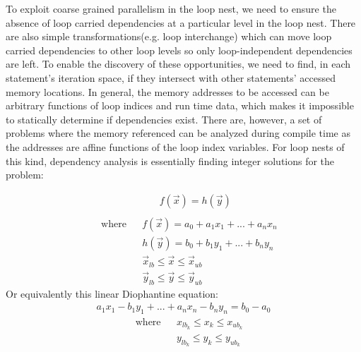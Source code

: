 To exploit coarse grained parallelism in the loop nest, we need to ensure the
absence of loop carried dependencies at a particular level in the loop nest. There are also simple transformations(e.g. loop interchange) which can move loop carried
dependencies to other loop levels so only loop-independent dependencies are left. To enable the discovery of these opportunities, we need to find, in each statement's iteration space, if they intersect with other statements' accessed memory locations. In general, the memory addresses to be accessed can be arbitrary functions of loop indices and run time data, which makes it impossible to statically determine if
dependencies exist. There are, however, a  set of problems where
the memory referenced can be analyzed during compile time as the addresses are affine functions of the loop index variables. For loop nests of this kind,
dependency analysis is essentially finding integer solutions for the problem:

\begin{equation}
\begin{aligned}
\label{dioeq}
& \text{} & & f(\vec{x}) = h(\vec{y}) \\
\end{aligned}
\end{equation}
\begin{equation*}
\begin{aligned}
& \text{ where}  & & f(\vec{x}) = a_0 + a_1x_1+...+a_nx_n \\
& & & h(\vec{y}) = b_0 + b_1y_1+...+b_ny_n \\
& & & \vec{x}_{lb} \le \vec{x} \le \vec{x}_{ub} \\
& & & \vec{y}_{lb} \le \vec{y} \le \vec{y}_{ub}
\end{aligned}
\end{equation*}
Or equivalently this linear Diophantine equation:
\begin{equation}
\begin{aligned}
\label{adioeq}
a_1x_1-b_1y_1+...+a_nx_n-b_ny_n = b_0 - a_0
\end{aligned}
\end{equation}
\begin{equation*}
\begin{aligned}
& \text{ where}  & & x_{lb_k} \le x_k \le x_{ub_k} \\
& & & y_{lb_k} \le y_k \le y_{ub_k} \\
\end{aligned}
\end{equation*}

